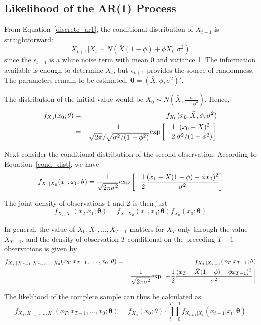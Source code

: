 \documentclass[11pt,reqno,final]{amsart}
\def\exp{\hbox{\rm exp}}
\begin{document}
\subsection{Likelihood of the AR(1) Process}
From Equation~\ref{discrete_ar1}, the conditional distribution of $X_{t+1}$ is straightforward:
\begin{equation} \label{cond_dist}
X_{t+1}|X_t \sim N(\bar{X} (1-\phi) + \phi X_t, \sigma^2)
\end{equation}
since the $\epsilon_{t+1}$ is a white noise term with mean 0 and variance 1. The information available is enough to determine $X_t$, but $\epsilon_{t+1}$ provides the source of randomness. The parameters remain to be estimated, $\mathbf{\theta}=(\bar{X},\phi, \sigma^2)'$.

The distribution of the initial value would be $X_0\sim N(\bar{X}, \frac{\sigma}{1-\phi^2})$. Hence,
\begin{eqnarray*}
f_{X_0}(x_0;\mathbf{\theta}) &=& f_{X_0}(x_0; \bar{X},\phi, \sigma^2) \\
                             &=& \frac{1}{\sqrt{2\pi}/\sqrt{\sigma^2/(1-\phi^2)}}\exp\left[ -\frac{1}{2} \frac{(x_0 - \bar{X})^2}{\sigma^2/(1-\phi^2)} \right]
\end{eqnarray*}

Next consider the conditional distribution of the second observation. According to Equation~\ref{cond_dist}, we have
$$
f_{X_1|X_0}(x_1, x_0;\mathbf{\theta}) = \frac{1}{\sqrt{2\pi\sigma^2}} \exp\left[ -\frac{1}{2} \frac{(x_1 - \bar{X} (1-\phi) - \phi x_0)^2}{\sigma^2} \right]
$$

The joint density of observations 1 and 2 is then just
$$
f_{X_2, X_1}(x_2.x_1; \mathbf{\theta}) = f_{X_1|X_0}(x_1, x_0;\mathbf{\theta}) f_{X_0}(x_0;\mathbf{\theta})
$$

In general, the value of $X_0, X_1, \ldots, X_{T-1}$ matters for $X_T$ only through the value $X_{T-1}$, and the density of observation $T$ conditional on the preceding $T-1$ observations is given by
\begin{eqnarray*}
f_{X_{T}|X_{T-1}, X_{T-2}, \ldots, X_0}(x_T|x_{T-1},\ldots, x_0;\mathbf{\theta}) &=& f_{X_{T}|X_{T-1}}(x_T|x_{T-1}; \mathbf{\theta}) \\
                             &=&  \frac{1}{\sqrt{2\pi\sigma^2}} \exp\left[ -\frac{1}{2} \frac{(x_T - \bar{X} (1-\phi) - \phi x_{T-1})^2}{\sigma^2} \right]
\end{eqnarray*}

The likelihood of the complete sample can thus be calculated as
$$
f_{X_T, X_{T-1}, \ldots, X_0}(x_T, x_{T-1}, \ldots, x_0; \mathbf{\theta}) = f_{X_0}(x_0;\theta) \cdot \prod_{t=0}^{T-1} f_{X_{t+1}|X_{t}}(x_{t+1}|x_t; \mathbf{\theta})
$$
\end{document}
